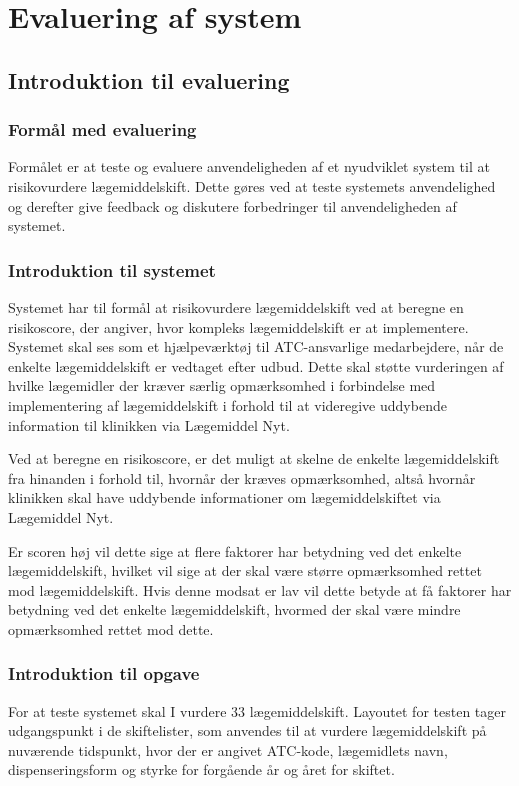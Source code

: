 \chapter{Evaluering af system} 
\section{Introduktion til evaluering} \label{App:Intro}

\subsection{Formål med evaluering}
Formålet er at teste og evaluere anvendeligheden af et nyudviklet system til at risikovurdere lægemiddelskift. Dette gøres ved at teste systemets anvendelighed og derefter give feedback og diskutere forbedringer til anvendeligheden af systemet.

\subsection{Introduktion til systemet}
Systemet har til formål at risikovurdere lægemiddelskift ved at beregne en risikoscore, der angiver, hvor kompleks lægemiddelskift er at implementere. Systemet skal ses som et hjælpeværktøj til ATC-ansvarlige medarbejdere, når de enkelte lægemiddelskift er vedtaget efter udbud.  Dette skal støtte vurderingen af hvilke lægemidler der kræver særlig opmærksomhed i forbindelse med implementering af lægemiddelskift i forhold til at videregive uddybende information til klinikken via Lægemiddel Nyt. 

Ved at beregne en risikoscore, er det muligt at skelne de enkelte lægemiddelskift fra hinanden i forhold til, hvornår der kræves opmærksomhed, altså hvornår klinikken skal have uddybende informationer om lægemiddelskiftet via Lægemiddel Nyt.

Er scoren høj vil dette sige at flere faktorer har betydning ved det enkelte lægemiddelskift, hvilket vil sige at der skal være større opmærksomhed rettet mod lægemiddelskift. Hvis denne modsat er lav vil dette betyde at få faktorer har betydning ved det enkelte lægemiddelskift, hvormed der skal være mindre opmærksomhed rettet mod dette.


\subsection{Introduktion til opgave}
For at teste systemet skal I vurdere 33 lægemiddelskift. Layoutet for testen tager udgangspunkt i de skiftelister, som anvendes til at vurdere lægemiddelskift på nuværende tidspunkt, hvor der er angivet ATC-kode, lægemidlets navn, dispenseringsform og styrke for forgående år og året for skiftet.

